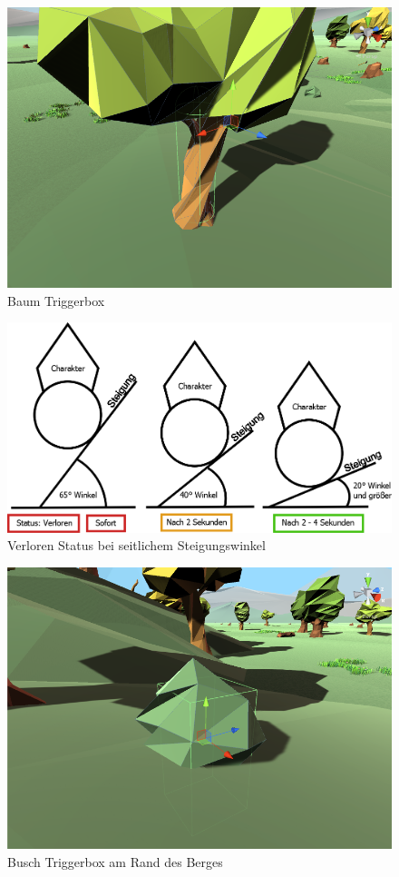 \begin{figure}[H]
\centering
\caption{Baum Triggerbox}
\label{Abb:BaumTrigger}
\includegraphics[scale=0.55]{Bilder/BaumTrigger.png}
\end{figure}

\begin{figure}[H]
\centering
\caption{Verloren Status bei seitlichem Steigungswinkel}
\label{Abb:SeitlWinkel}
\includegraphics[scale=0.275]{Bilder/Diagramme/VerlierWinkelSeitlich.png}
\end{figure}

\begin{figure}[H]
\centering
\caption{Busch Triggerbox am Rand des Berges}
\label{Abb:BuschTrigger}
\includegraphics[scale=0.55]{Bilder/BuschTrigger.png}
\end{figure}

